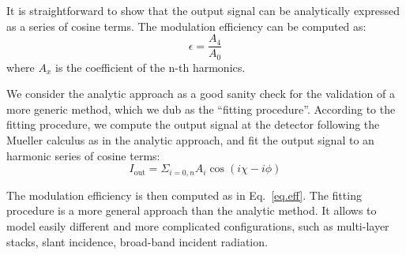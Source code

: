 It is straightforward to show that the output signal can be analytically expressed as a series of cosine terms. The modulation efficiency can be computed as:
\begin{equation}\label{eq:eff}
\epsilon=\frac{A_4}{A_0}
\end{equation}
where $A_x$ is the coefficient of the n-th harmonics.

We consider the analytic approach as a good sanity check for the validation of a more generic method, which we dub as the ``fitting procedure''. According to the fitting procedure, we compute the output signal at the detector following the Mueller calculus as in the analytic approach, and fit the output signal to an harmonic series of cosine terms:
\begin{equation}
I_\mathrm{out}=\Sigma_{i=0,n} A_i \cos(i\chi-i\phi)
\end{equation}

The modulation efficiency is then computed as in Eq.~\ref{eq.eff}. The fitting procedure is a more general approach than the analytic method. It allows to model easily different and more complicated configurations, such as multi-layer stacks, slant incidence, broad-band incident radiation.

